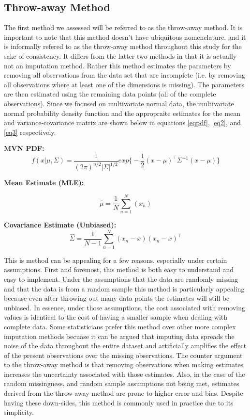 \documentclass{svproc}
\begin{document}
\subsection{Throw-away Method}
The first method we assessed will be referred to as the throw-away method. It is important to note that this method doesn't have ubiquitous nomenclature, and it is informally refered to as the throw-away method throughout this study for the sake of consistency. It differs from the latter two methods in that it is actually not an imputation method. Rather this method estimates the parameters by removing all observations from the data set that are incomplete (i.e. by removing all observations where at least one of the dimensions is missing). The parameters are then estimated using the remaining data points (all of the complete observations). Since we focused on multivariate normal data, the multivariate normal probability density function and the appropraite estimates for the mean and variance-covariance matrix are shown below in equations \ref{eqpdf}, \ref{eq2}, and \ref{eq3} respectively.

\medskip
\textbf{MVN PDF:}
\begin{equation}
f(x|\mu,\Sigma) = \frac{1}{(2\pi)^{n/2}\vert \Sigma \vert^{1/2}} exp{ \bigl\{-\frac{1}{2}(x-\mu)^\top \Sigma^{-1}(x-\mu) \bigr\} }
\label{eqpdf}
\end{equation}




\textbf{Mean Estimate (MLE):}

\begin{equation}
\hat{\mu} = \frac{1}{N} \sum_{n=1}^N(x_n)
\label{eq2}
\end{equation}


\textbf{ Covariance Estimate (Unbiased): }
\begin{equation}
\hat{\Sigma} = \frac{1}{N-1} \sum_{n=1}^N(x_n - \bar{x})(x_n - \bar{x})^\top
\label{eq3}
\end{equation}


This is method can be appealing for a few reasons, especially under certain assumptions. First and foremost, this method is both easy to understand and easy to implement. Under the assumptions that the data are randomly missing and that the data is from a random sample this method is particularly appealing because even after throwing out many data points the estimates will still be unbiased. In essence, under those assumptions, the cost associated with removing values is identical to the cost of having a smaller sample when dealing with complete data. Some statisticians prefer this method over other more complex imputation methods becuase it can be argued that imputing data spreads the noise of the data throughout the entire dataset and artificially amplifies the effect of the present observations over the missing observations. The counter argument to the throw-away method is that removing observations when making estimates increases the uncertainty associated with those estimates. Also, in the case of the random missingness, and random sample assumptions not being met, estimates derived from the throw-away method are prone to higher error and bias. Despite having these down-sides, this method is commonly used in practice due to its simplicity.
\end{document}
